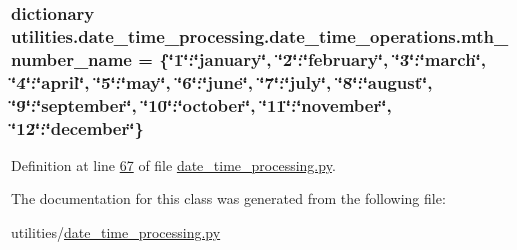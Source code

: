 \subsubsection[{mth\+\_\+number\+\_\+name}]{\setlength{\rightskip}{0pt plus 5cm}dictionary utilities.\+date\+\_\+time\+\_\+processing.\+date\+\_\+time\+\_\+operations.\+mth\+\_\+number\+\_\+name = \{\char`\"{}1\char`\"{}\+:\char`\"{}january\char`\"{}, \char`\"{}2\char`\"{}\+:\char`\"{}february\char`\"{}, \char`\"{}3\char`\"{}\+:\char`\"{}march\char`\"{}, \char`\"{}4\char`\"{}\+:\char`\"{}april\char`\"{}, \char`\"{}5\char`\"{}\+:\char`\"{}may\char`\"{}, \char`\"{}6\char`\"{}\+:\char`\"{}june\char`\"{}, \char`\"{}7\char`\"{}\+:\char`\"{}july\char`\"{}, \char`\"{}8\char`\"{}\+:\char`\"{}august\char`\"{}, \char`\"{}9\char`\"{}\+:\char`\"{}september\char`\"{}, \char`\"{}10\char`\"{}\+:\char`\"{}october\char`\"{}, \char`\"{}11\char`\"{}\+:\char`\"{}november\char`\"{}, \char`\"{}12\char`\"{}\+:\char`\"{}december\char`\"{}\}\hspace{0.3cm}{\ttfamily [static]}}\label{classutilities_1_1date__time__processing_1_1date__time__operations_a640d6fe5b1045e4c92057b524264295d}


Definition at line \hyperlink{date__time__processing_8py_source_l00067}{67} of file \hyperlink{date__time__processing_8py_source}{date\+\_\+time\+\_\+processing.\+py}.



The documentation for this class was generated from the following file\+:\begin{DoxyCompactItemize}
\item 
utilities/\hyperlink{date__time__processing_8py}{date\+\_\+time\+\_\+processing.\+py}\end{DoxyCompactItemize}
